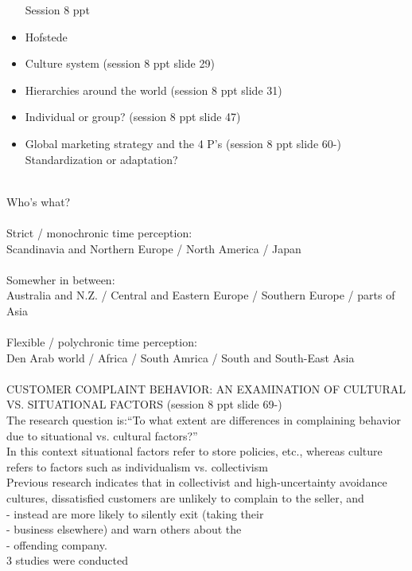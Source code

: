 \begin{itemize}  
Session 8 ppt

\item 
Hofstede 
\item 
Culture system (session 8 ppt slide 29)
\item 
Hierarchies around the world (session 8 ppt slide 31)
\item
Individual or group? (session 8 ppt slide 47)
\item
Global marketing strategy and the 4 P's (session 8 ppt slide 60-)
\\Standardization or adaptation?
\end{itemize}

\\
Who's what?
\\\\Strict / monochronic time perception:
\\Scandinavia and Northern Europe / North America / Japan
\\\\Somewher in between:
\\Australia and N.Z. / Central and Eastern Europe / Southern Europe / parts of Asia
\\\\Flexible / polychronic time perception:
\\Den Arab world / Africa / South Amrica / South and South-East Asia
\\\\
CUSTOMER COMPLAINT BEHAVIOR: AN EXAMINATION OF CULTURAL VS. SITUATIONAL
FACTORS (session 8 ppt slide 69-)
\\The research question is:“To what extent are differences in complaining behavior due to situational vs. cultural factors?” 
\\In this context situational factors refer to store policies, etc., whereas culture refers to factors such as individualism vs. collectivism
\\Previous research indicates that in collectivist  and high-uncertainty avoidance cultures, dissatisfied customers are unlikely to complain to the seller, and
  \\   - instead are more likely to silently exit (taking their
\\     - business elsewhere) and warn others about the
  \\   - offending company.
\\3 studies were conducted

